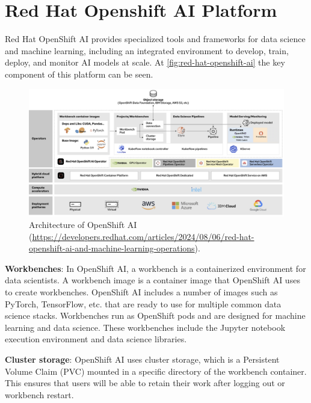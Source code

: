 \section*{Red Hat Openshift AI Platform}

Red Hat OpenShift AI provides specialized tools and frameworks for data science and machine learning, including an integrated environment to develop, train, deploy, and monitor AI models at scale. At \autoref{fig:red-hat-openshift-ai} the key component of this platform can be seen.


\begin{figure}[htbp]
    \centering
    \includegraphics[width=\linewidth]{obrazky-figures/02-theoretical-basis/openshift_ai.png}
    \caption{Architecture of OpenShift AI (\url{https://developers.redhat.com/articles/2024/08/06/red-hat-openshift-ai-and-machine-learning-operations}).}
    \label{fig:red-hat-openshift-ai}
\end{figure}


\textbf{Workbenches}:
In OpenShift AI, a workbench is a containerized environment for data scientists. A workbench image is a container image that OpenShift AI uses to create workbenches. OpenShift AI includes a number of images such as PyTorch, TensorFlow, etc. that are ready to use for multiple common data science stacks. Workbenches run as OpenShift pods and are designed for machine learning and data science. These workbenches include the Jupyter notebook execution environment and data science libraries.

\medskip

\textbf{Cluster storage}:
OpenShift AI uses cluster storage, which is a Persistent Volume Claim (PVC) mounted in a specific directory of the workbench container. This ensures that users will be able to retain their work after logging out or workbench restart.

\medskip

